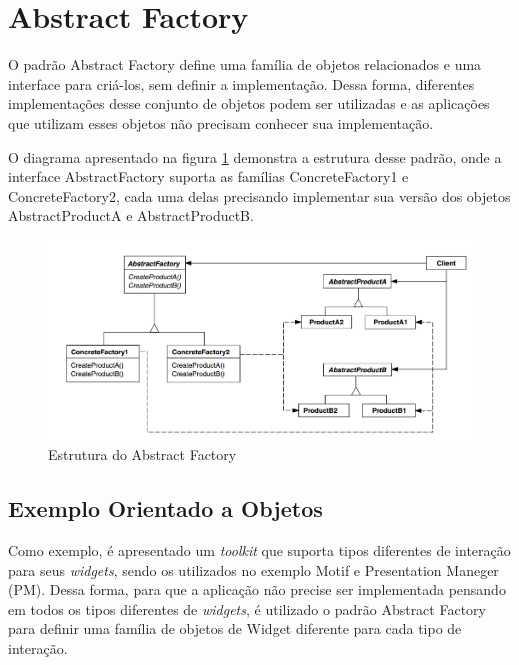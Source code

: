\section{Abstract Factory}

O padrão Abstract Factory define uma família 
de objetos relacionados e uma interface para 
criá-los, sem definir a implementação. Dessa 
forma, diferentes implementações desse 
conjunto de objetos podem ser utilizadas e 
as aplicações que utilizam esses objetos 
não precisam conhecer sua implementação.

O diagrama apresentado na figura \ref{abfactory_struct} 
demonstra a estrutura desse padrão, onde a 
interface AbstractFactory suporta as famílias 
ConcreteFactory1 e ConcreteFactory2, cada uma 
delas precisando implementar sua versão dos 
objetos AbstractProductA e AbstractProductB.

\begin{figure}[htb]
	\caption{\label{abfactory_struct}Estrutura do Abstract Factory}
	\begin{center}
	    \includegraphics[scale=0.4]{5_padroes-contexto-funcional/5.1_criacionais/5.1.2_abstract-factory/diagram.png}
	\end{center}
\end{figure}

\subsection*{Exemplo Orientado a Objetos}

Como exemplo, é apresentado um \textit{toolkit} 
que suporta tipos diferentes de interação para 
seus \textit{widgets}, sendo 
os utilizados no exemplo Motif e Presentation 
Maneger (PM). Dessa forma, para que a aplicação 
não precise ser implementada pensando em todos 
os tipos diferentes de \textit{widgets}, é 
utilizado o padrão Abstract Factory para 
definir uma família de objetos de Widget 
diferente para cada tipo de interação. 

